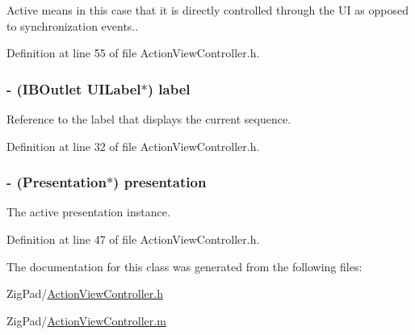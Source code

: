 Active means in this case that it is directly controlled through the UI as opposed to synchronization events.. 

Definition at line 55 of file ActionViewController.h.

\hypertarget{interface_action_view_controller_a729dc1b9adc6098142f097c005a990ba}{
\subsubsection[{label}]{\setlength{\rightskip}{0pt plus 5cm}-\/ (IBOutlet UILabel$\ast$) label}}
\label{interface_action_view_controller_a729dc1b9adc6098142f097c005a990ba}
Reference to the label that displays the current sequence. 

Definition at line 32 of file ActionViewController.h.

\hypertarget{interface_action_view_controller_a4687fd0668ba32c76160e4d4f1747c12}{
\subsubsection[{presentation}]{\setlength{\rightskip}{0pt plus 5cm}-\/ ({\bf Presentation}$\ast$) presentation}}
\label{interface_action_view_controller_a4687fd0668ba32c76160e4d4f1747c12}
The active presentation instance. 

Definition at line 47 of file ActionViewController.h.



The documentation for this class was generated from the following files:\begin{DoxyCompactItemize}
\item 
ZigPad/\hyperlink{_action_view_controller_8h}{ActionViewController.h}\item 
ZigPad/\hyperlink{_action_view_controller_8m}{ActionViewController.m}\end{DoxyCompactItemize}
